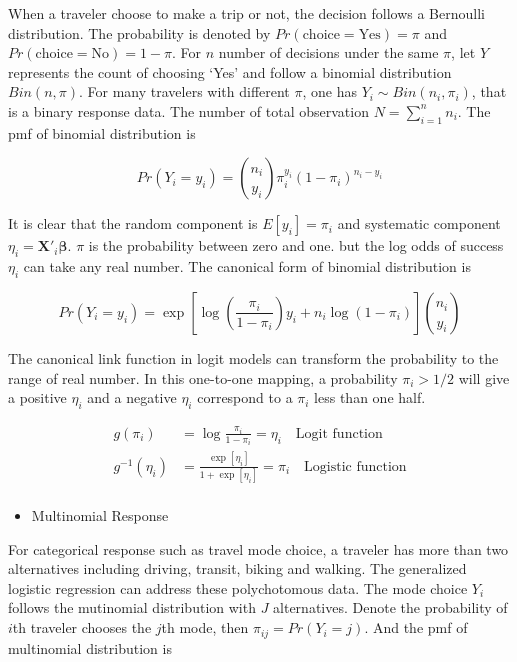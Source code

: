 \documentclass[
  11pt,
  openany]{memoir}
\providecommand{\tightlist}{%
  \setlength{\itemsep}{0pt}\setlength{\parskip}{0pt}}
\begin{document}
When a traveler choose to make a trip or not, the decision follows a Bernoulli distribution. The probability is denoted by \(Pr(\text{choice}=\text{Yes})=\pi\) and \(Pr(\text{choice}=\text{No})=1-\pi\).
For \(n\) number of decisions under the same \(\pi\), let \(Y\) represents the count of choosing `Yes' and follow a binomial distribution \(Bin(n,\pi)\).
For many travelers with different \(\pi\), one has \(Y_i\sim Bin(n_i,\pi_i)\), that is a binary response data. The number of total observation \(N=\sum_{i=1}^n n_i\). The pmf of binomial distribution is

\begin{equation}
Pr(Y_i = y_i) =  {{n_i}\choose{y_i}}  \pi_i^{y_i} (1-\pi_i)^{n_i-y_i}
\end{equation}

It is clear that the random component is \(E[y_i]=\pi_i\) and systematic component \(\eta_i=\mathbf{X}'_i\boldsymbol\beta\).
\(\pi\) is the probability between zero and one. but the log odds of success \(\eta_i\) can take any real number. The canonical form of binomial distribution is

\begin{equation}
Pr(Y_i = y_i) = \exp\left[\log(\frac{\pi_i}{1-\pi_i})y_i+n_i\log(1-\pi_i)\right]{{n_i}\choose{y_i}}
\end{equation}

The canonical link function in logit models can transform the probability to the range of real number. In this one-to-one mapping, a probability \(\pi_i>1/2\) will give a positive \(\eta_i\) and a negative \(\eta_i\) correspond to a \(\pi_i\) less than one half.

\begin{equation}
\begin{split}
g(\pi_i)&=\log\frac{\pi_i}{1-\pi_i}=\eta_i\quad\text{Logit function}\\
g^{-1}(\eta_i)&=\frac{\exp[\eta_i]}{1+\exp[\eta_i]}=\pi_i\quad\text{Logistic function}\\
\end{split}
\label{eq:logit-link}
\end{equation}

\begin{itemize}
\tightlist
\item
  Multinomial Response
\end{itemize}

For categorical response such as travel mode choice, a traveler has more than two alternatives including driving, transit, biking and walking. The generalized logistic regression can address these polychotomous data.
The mode choice \(Y_i\) follows the mutinomial distribution with \(J\) alternatives.
Denote the probability of \(i\)th traveler chooses the \(j\)th mode, then \(\pi_{ij}=Pr(Y_i=j)\).
And the pmf of multinomial distribution is
\end{document}
